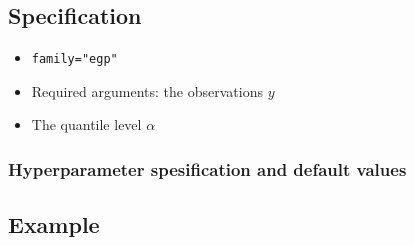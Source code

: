 \documentclass[a4paper,11pt]{article}
\begin{document}
\subsection*{Specification}

\begin{itemize}
\item \texttt{family="egp"}
\item Required arguments: the observations $y$
\item The quantile level $\alpha$    
\end{itemize}

\subsubsection*{Hyperparameter spesification and default values}
{\small }

\clearpage
\subsection*{Example}
{\small }
\end{document}
